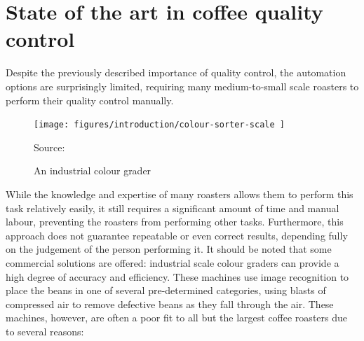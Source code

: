\section{State of the art in coffee quality control}
\label{sec:qc-state-of-the-art} Despite the previously described importance of quality
control, the automation options are surprisingly limited, requiring many medium-to-small
scale roasters to perform their quality control manually.
\begin{figure}
	\texttt{[image: 
		figures/introduction/colour-sorter-scale
	]}
	\caption*
	{Source: \cite{colourSorterImg}}
	\caption{An industrial colour grader}
	\label{fig:colourSorterExample}
\end{figure}
While the knowledge
and expertise of many roasters allows them to perform this task relatively
easily, it still requires a significant amount of time and manual labour,
preventing the roasters from performing other tasks.
Furthermore, this approach
does not guarantee repeatable or even correct results, depending fully on the judgement
of the person performing it.
It should be noted that some commercial solutions are offered: industrial scale colour
graders can provide a high degree of accuracy and efficiency.
These machines use
image recognition to place the beans in one of several pre-determined categories,
using blasts of compressed air to remove defective beans as they fall through the
air.
These machines, however, are often a poor fit to all but the largest coffee
roasters due to several reasons:
